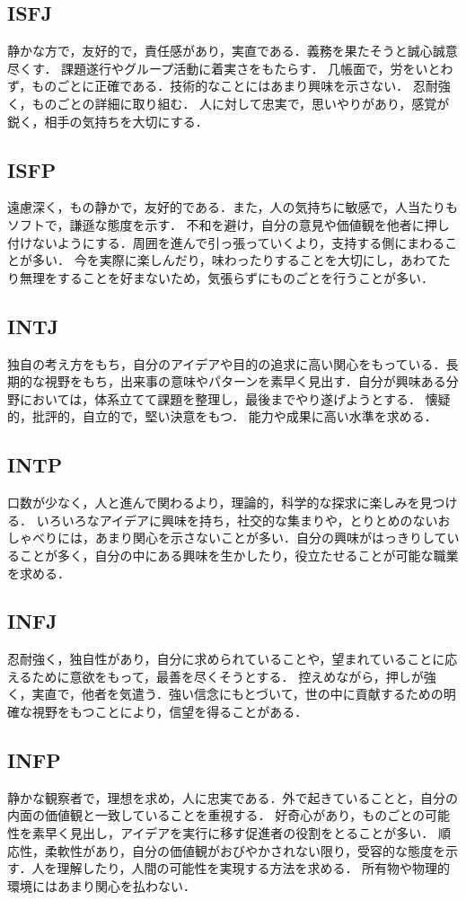 \subsection{ISFJ}
静かな方で，友好的で，責任感があり，実直である．義務を果たそうと誠心誠意尽くす．
課題遂行やグループ活動に着実さをもたらす．
几帳面で，労をいとわず，ものごとに正確である．技術的なことにはあまり興味を示さない．
忍耐強く，ものごとの詳細に取り組む．
人に対して忠実で，思いやりがあり，感覚が鋭く，相手の気持ちを大切にする．
\subsection{ISFP}

遠慮深く，もの静かで，友好的である．また，人の気持ちに敏感で，人当たりもソフトで，謙遜な態度を示す．
不和を避け，自分の意見や価値観を他者に押し付けないようにする．周囲を進んで引っ張っていくより，支持する側にまわることが多い．
今を実際に楽しんだり，味わったりすることを大切にし，あわてたり無理をすることを好まないため，気張らずにものごとを行うことが多い．
\newpage

\subsection{INTJ}
独自の考え方をもち，自分のアイデアや目的の追求に高い関心をもっている．長期的な視野をもち，出来事の意味やパターンを素早く見出す．自分が興味ある分野においては，体系立てて課題を整理し，最後までやり遂げようとする．
懐疑的，批評的，自立的で，堅い決意をもつ．
能力や成果に高い水準を求める．
\subsection{INTP}
口数が少なく，人と進んで関わるより，理論的，科学的な探求に楽しみを見つける．
いろいろなアイデアに興味を持ち，社交的な集まりや，とりとめのないおしゃべりには，あまり関心を示さないことが多い．自分の興味がはっきりしていることが多く，自分の中にある興味を生かしたり，役立たせることが可能な職業を求める．
\subsection{INFJ}
忍耐強く，独自性があり，自分に求められていることや，望まれていることに応えるために意欲をもって，最善を尽くそうとする．
控えめながら，押しが強く，実直で，他者を気遣う．強い信念にもとづいて，世の中に貢献するための明確な視野をもつことにより，信望を得ることがある．
\subsection{INFP}
静かな観察者で，理想を求め，人に忠実である．外で起きていることと，自分の内面の価値観と一致していることを重視する．
好奇心があり，ものごとの可能性を素早く見出し，アイデアを実行に移す促進者の役割をとることが多い．
順応性，柔軟性があり，自分の価値観がおびやかされない限り，受容的な態度を示す．人を理解したり，人間の可能性を実現する方法を求める．
所有物や物理的環境にはあまり関心を払わない．
\newpage

